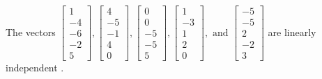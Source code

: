 \begin{exercise}
\begin{exerciseStatement}
  \end{exerciseStatement}
  \begin{exerciseAnswer}
   The vectors \(\left[\begin{array}{r}
1 \\
-4 \\
-6 \\
-2 \\
5
\end{array}\right] , \left[\begin{array}{r}
4 \\
-5 \\
-1 \\
4 \\
0
\end{array}\right] , \left[\begin{array}{r}
0 \\
0 \\
-5 \\
-5 \\
5
\end{array}\right] , \left[\begin{array}{r}
1 \\
-3 \\
1 \\
2 \\
0
\end{array}\right] , \text{ and } \left[\begin{array}{r}
-5 \\
-5 \\
2 \\
-2 \\
3
\end{array}\right]\) are 
  	 linearly independent  .
  


  \end{exerciseAnswer}
\end{exercise}